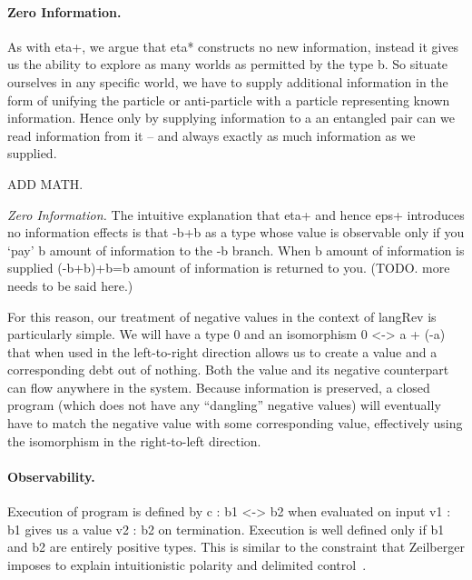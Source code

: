 \documentclass[preprint]{sigplanconf}
\begin{document}


\paragraph*{Zero Information.}
As with {{eta+}}, we argue that {{eta*}} constructs no new
information, instead it gives us the ability to explore as many worlds
as permitted by the type {{b}}. So situate ourselves in any specific
world, we have to supply additional information in the form of
unifying the particle or anti-particle with a particle representing
known information. Hence only by supplying information to a an
entangled pair can we read information from it -- and always exactly
as much information as we supplied.

ADD MATH. 

\emph{Zero Information.}  The intuitive explanation that {{eta+}} and
hence {{eps+}} introduces no information effects is that {{-b+b}} as a
type whose value is observable only if you `pay' {{b}} amount of
information to the {{-b}} branch. When {{b}} amount of information is
supplied {{(-b+b)+b=b}} amount of information is returned to
you. (TODO. more needs to be said here.)

For this reason, our treatment of negative values in the context of
{{langRev}} is particularly simple. We will have a type $0$ and an
isomorphism {{0 <-> a + (-a)}} that when used in the left-to-right direction
allows us to create a value and a corresponding debt out of nothing. Both the
value and its negative counterpart can flow anywhere in the system. Because
information is preserved, a closed program (which does not have any
``dangling'' negative values) will eventually have to match the negative
value with some corresponding value, effectively using the isomorphism in the
right-to-left direction. 



\paragraph*{Observability.} 
Execution of program is defined by {{c : b1 <-> b2}} when evaluated on input
{{v1 : b1}} gives us a value {{v2 : b2}} on termination. Execution is well
defined only if {{b1}} and {{b2}} are entirely positive types. This is
similar to the constraint that Zeilberger imposes to explain intuitionistic
polarity and delimited control~\cite{10.1109/LICS.2010.23}.
\end{document}
